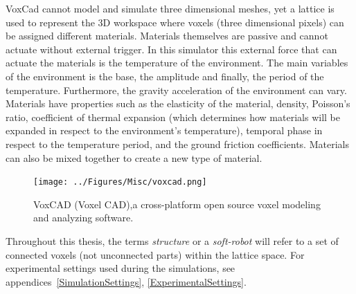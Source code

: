 VoxCad cannot model and simulate three dimensional meshes, yet a lattice is used to represent the 3D workspace where voxels (three dimensional pixels) can be assigned different materials. Materials themselves are passive and cannot actuate without external trigger. In this simulator this external force that can actuate the materials is the temperature of the environment. The main variables of the environment is the base, the amplitude and finally, the period of the temperature. Furthermore, the gravity acceleration of the environment can vary. Materials have properties such as the elasticity of the material, density, Poisson's ratio, coefficient of thermal expansion (which determines how materials will be expanded in respect to the environment's temperature), temporal phase in respect to the temperature period, and the ground friction coefficients. Materials can also be mixed together to create a new type of material.

\begin{figure}[t!]
\centering
\texttt{[image: ../Figures/Misc/voxcad.png]}
\caption{VoxCAD (Voxel CAD),a cross-platform open source voxel modeling and analyzing software.}
\label{fig:VoxCAD}
\end{figure}

Throughout this thesis, the terms \textit{structure} or a \textit{soft-robot} will refer to a set of connected voxels (not unconnected parts) within the lattice space. For experimental settings used during the simulations, see appendices~\ref{SimulationSettings}, \ref{ExperimentalSettings}.

